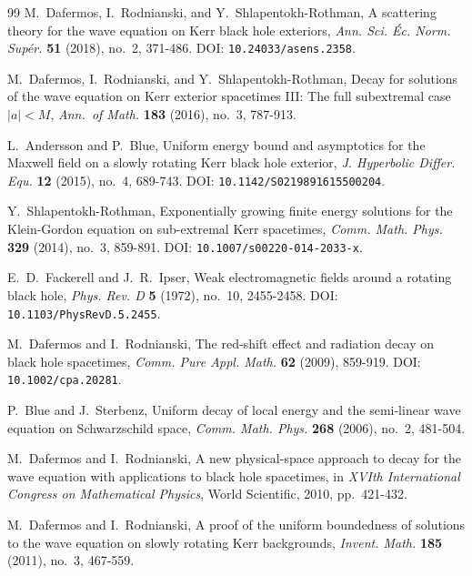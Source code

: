 \documentclass[11pt]{article}
\numberwithin{equation}{section}
\theoremstyle{plain}
\theoremstyle{definition}
\theoremstyle{remark}
\begin{document}
\begin{thebibliography}{99}
M.~Dafermos, I.~Rodnianski, and Y.~Shlapentokh-Rothman,
\newblock A scattering theory for the wave equation on Kerr black hole exteriors,
\newblock \emph{Ann. Sci. \'Ec. Norm. Sup\'er.} \textbf{51} (2018), no.~2, 371-486.
\newblock DOI: \texttt{10.24033/asens.2358}.

M.~Dafermos, I.~Rodnianski, and Y.~Shlapentokh-Rothman,
\newblock Decay for solutions of the wave equation on Kerr exterior spacetimes III: The full subextremal case $|a|<M$,
\newblock \emph{Ann.\ of Math.} \textbf{183} (2016), no.~3, 787-913.

L.~Andersson and P.~Blue,
\newblock Uniform energy bound and asymptotics for the Maxwell field on a slowly rotating Kerr black hole exterior,
\newblock \emph{J. Hyperbolic Differ. Equ.} \textbf{12} (2015), no.~4, 689-743.
\newblock DOI: \texttt{10.1142/S0219891615500204}.

Y.~Shlapentokh-Rothman,
\newblock Exponentially growing finite energy solutions for the Klein-Gordon equation on sub-extremal Kerr spacetimes,
\newblock \emph{Comm. Math. Phys.} \textbf{329} (2014), no.~3, 859-891.
\newblock DOI: \texttt{10.1007/s00220-014-2033-x}.

E.~D.~Fackerell and J.~R.~Ipser,
\newblock Weak electromagnetic fields around a rotating black hole,
\newblock \emph{Phys. Rev. D} \textbf{5} (1972), no.~10, 2455-2458.
\newblock DOI: \texttt{10.1103/PhysRevD.5.2455}.

M.~Dafermos and I.~Rodnianski,
\newblock The red-shift effect and radiation decay on black hole spacetimes,
\newblock \emph{Comm. Pure Appl. Math.} \textbf{62} (2009), 859-919.
\newblock DOI: \texttt{10.1002/cpa.20281}.

P.~Blue and J.~Sterbenz,
\newblock Uniform decay of local energy and the semi-linear wave equation on Schwarzschild space,
\newblock \emph{Comm. Math. Phys.} \textbf{268} (2006), no.~2, 481-504.

M.~Dafermos and I.~Rodnianski,
\newblock A new physical-space approach to decay for the wave equation with applications to black hole spacetimes,
\newblock in \emph{XVIth International Congress on Mathematical Physics}, World Scientific, 2010, pp.~421-432.

M.~Dafermos and I.~Rodnianski,
\newblock A proof of the uniform boundedness of solutions to the wave equation on slowly rotating Kerr backgrounds,
\newblock \emph{Invent. Math.} \textbf{185} (2011), no.~3, 467-559.


\end{thebibliography}
\end{document}
